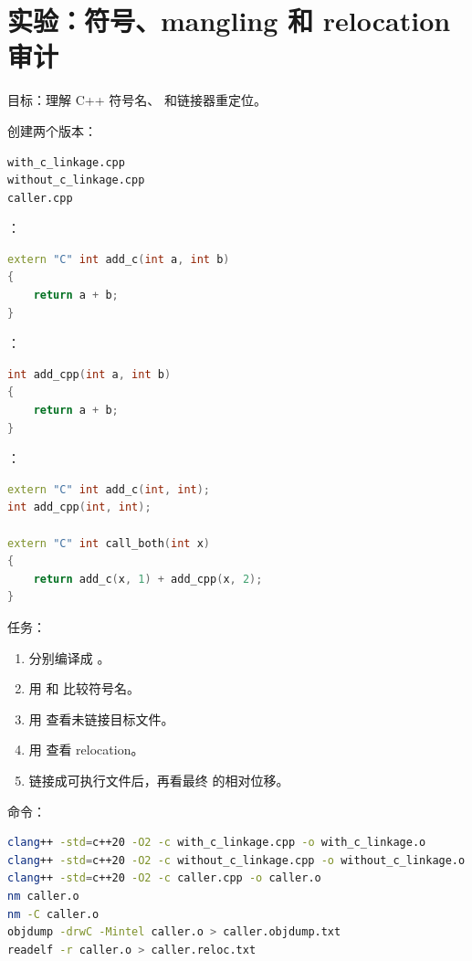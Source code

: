 \section{实验：符号、mangling 和 relocation 审计}

\begin{labbox}
目标：理解 C++ 符号名、 和链接器重定位。

创建两个版本：

\begin{lstlisting}
with_c_linkage.cpp
without_c_linkage.cpp
caller.cpp
\end{lstlisting}

：

\begin{lstlisting}[language=C++]
extern "C" int add_c(int a, int b)
{
    return a + b;
}
\end{lstlisting}

：

\begin{lstlisting}[language=C++]
int add_cpp(int a, int b)
{
    return a + b;
}
\end{lstlisting}

：

\begin{lstlisting}[language=C++]
extern "C" int add_c(int, int);
int add_cpp(int, int);

extern "C" int call_both(int x)
{
    return add_c(x, 1) + add_cpp(x, 2);
}
\end{lstlisting}

任务：

\begin{enumerate}
  \item 分别编译成 。
  \item 用  和  比较符号名。
  \item 用  查看未链接目标文件。
  \item 用  查看 relocation。
  \item 链接成可执行文件后，再看最终  的相对位移。
\end{enumerate}

命令：

\begin{lstlisting}[language=bash]
clang++ -std=c++20 -O2 -c with_c_linkage.cpp -o with_c_linkage.o
clang++ -std=c++20 -O2 -c without_c_linkage.cpp -o without_c_linkage.o
clang++ -std=c++20 -O2 -c caller.cpp -o caller.o
nm caller.o
nm -C caller.o
objdump -drwC -Mintel caller.o > caller.objdump.txt
readelf -r caller.o > caller.reloc.txt
\end{lstlisting}


\end{labbox}
